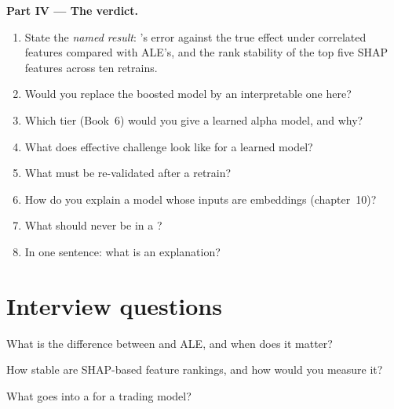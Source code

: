 \begin{problem}
\medskip\noindent\textbf{Part IV --- The verdict.}
\begin{enumerate}[resume]
\item State the \emph{named result}: 's error against the true effect under correlated features compared with
ALE's, and the rank stability of the top five SHAP features across ten retrains.
\item Would you replace the boosted model by an interpretable one here?
\item Which tier (Book~6) would you give a learned alpha model, and why?
\item What does effective challenge look like for a learned model?
\item What must be re-validated after a retrain?
\item How do you explain a model whose inputs are embeddings (chapter~10)?
\item What should never be in a ?
\item In one sentence: what is an explanation?
\end{enumerate}
\end{problem}

\section{Interview questions}

\begin{interviewq}\label{iq:ml:interpretability-and-model-governance:1}
What is the difference between  and ALE, and when does it matter?
\end{interviewq}

\begin{interviewq}\label{iq:ml:interpretability-and-model-governance:2}
How stable are SHAP-based feature rankings, and how would you measure it?
\end{interviewq}

\begin{interviewq}\label{iq:ml:interpretability-and-model-governance:3}
What goes into a  for a trading model?
\end{interviewq}

